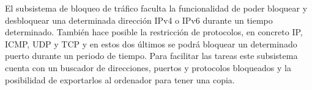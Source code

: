 El subsistema de bloqueo de tráfico faculta la funcionalidad de poder bloquear y desbloquear una determinada dirección IPv4 o IPv6 durante un tiempo determinado. También hace posible la restricción de protocolos, en concreto IP, ICMP, UDP y TCP y en estos dos últimos se podrá bloquear un determinado puerto durante un periodo de tiempo. Para facilitar las tareas este subsistema cuenta con un buscador de direcciones, puertos y protocolos bloqueados y la posibilidad de exportarlos al ordenador para tener una copia.